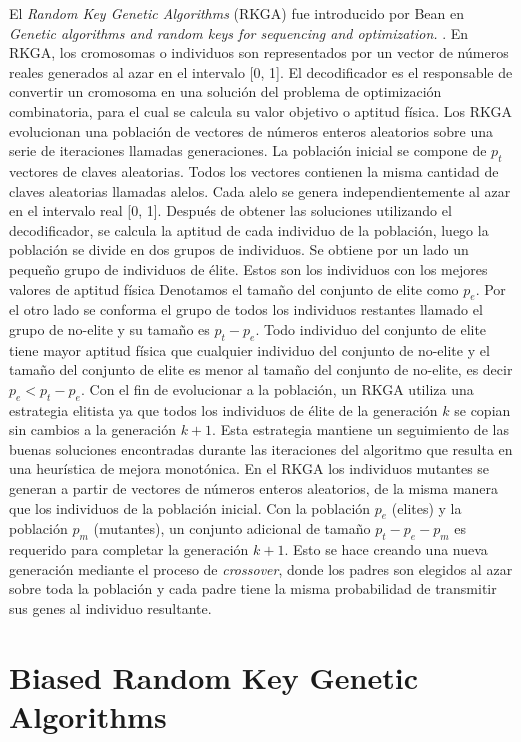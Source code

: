 El \textit{Random Key Genetic Algorithms} (RKGA) fue introducido por Bean en \textit{Genetic algorithms and random keys for sequencing and optimization.} \cite{Bean}. En RKGA, los cromosomas o individuos son representados por un vector de números reales generados al azar en el intervalo [0, 1]. El decodificador es el responsable de convertir un cromosoma en una solución del problema de optimización combinatoria, para el cual se calcula su valor objetivo o aptitud física. Los RKGA evolucionan una población de vectores de números enteros aleatorios sobre una serie de iteraciones llamadas generaciones. La población inicial se compone de $p_t$ vectores de claves aleatorias. Todos los vectores contienen la misma cantidad de claves aleatorias llamadas alelos. Cada alelo se genera independientemente al azar en el intervalo real [0, 1]. Después de obtener las soluciones utilizando el decodificador, se calcula la aptitud de cada individuo de la población, luego la población se divide en dos grupos de individuos. Se obtiene por un lado un pequeño grupo de individuos de élite. Estos son los individuos con los mejores valores de aptitud física Denotamos el tamaño del conjunto de elite como $p_e$. Por el otro lado se conforma el grupo de todos los individuos restantes llamado el grupo de no-elite y su tamaño es $p_t-p_e$. Todo individuo del conjunto de elite tiene mayor aptitud física que cualquier individuo del conjunto de no-elite y el tamaño del conjunto de elite es menor al tamaño del conjunto de no-elite, es decir $p_e<p_t-p_e$. Con el fin de evolucionar a la población, un RKGA utiliza una estrategia elitista ya que todos los individuos de élite de la generación $k$ se copian sin cambios a la generación $k+1$. Esta estrategia mantiene un seguimiento de las buenas soluciones encontradas durante las iteraciones del algoritmo que resulta en una heurística de mejora monotónica. En el RKGA los individuos mutantes se generan a partir de vectores de números enteros aleatorios, de la misma manera que los individuos de la población inicial. Con la población $p_e$ (elites) y la población $p_m$ (mutantes), un conjunto adicional de tamaño $p_t - p_e - p_m$ es requerido para completar la generación $k+1$. Esto se hace creando una nueva generación mediante el proceso de \textit{crossover}, donde los padres son elegidos al azar sobre toda la población y cada padre tiene la misma probabilidad de transmitir sus genes al individuo resultante.

\section{Biased Random Key Genetic Algorithms}\label{sec:brkga}

